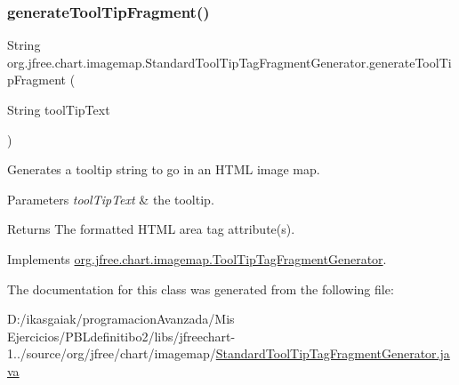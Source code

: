 \subsubsection{\texorpdfstring{generate\+Tool\+Tip\+Fragment()}{generateToolTipFragment()}}
{\footnotesize\ttfamily String org.\+jfree.\+chart.\+imagemap.\+Standard\+Tool\+Tip\+Tag\+Fragment\+Generator.\+generate\+Tool\+Tip\+Fragment (\begin{DoxyParamCaption}\item[{String}]{tool\+Tip\+Text }\end{DoxyParamCaption})}

Generates a tooltip string to go in an H\+T\+ML image map.


\begin{DoxyParams}{Parameters}
{\em tool\+Tip\+Text} & the tooltip.\\
\hline
\end{DoxyParams}
\begin{DoxyReturn}{Returns}
The formatted H\+T\+ML area tag attribute(s). 
\end{DoxyReturn}


Implements \mbox{\hyperlink{interfaceorg_1_1jfree_1_1chart_1_1imagemap_1_1_tool_tip_tag_fragment_generator_a4e96c861b1fa7000056ed50c9ade7484}{org.\+jfree.\+chart.\+imagemap.\+Tool\+Tip\+Tag\+Fragment\+Generator}}.



The documentation for this class was generated from the following file\+:\begin{DoxyCompactItemize}
\item 
D\+:/ikasgaiak/programacion\+Avanzada/\+Mis Ejercicios/\+P\+B\+Ldefinitibo2/libs/jfreechart-\/1../source/org/jfree/chart/imagemap/\mbox{\hyperlink{_standard_tool_tip_tag_fragment_generator_8java}{Standard\+Tool\+Tip\+Tag\+Fragment\+Generator.\+java}}\end{DoxyCompactItemize}
